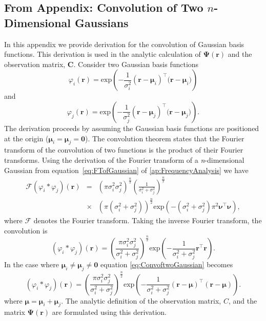 \documentclass[10pt]{article}
\begin{document}
\subsection*{From Appendix: Convolution of Two $n$-Dimensional Gaussians}\label{ap:ConvOfGaussians}
In this appendix we provide derivation for the convolution of Gaussian basis functions. This derivation is used in the analytic calculation of $\boldsymbol\Psi(\mathbf{r})$ and the observation matrix, $\mathbf C$. Consider two Gaussian basis functions
\begin{equation}\label{eq:n_dimensional_Gaussian1}
 \varphi_i(\mathbf r)=\mathrm{exp}\left({-\frac{1}{\sigma_i^2} (\mathbf r-\boldsymbol \mu_i)^\top(\mathbf r-\boldsymbol \mu_i})\right)
\end{equation}
and 
\begin{equation}\label{eq:n_dimensional_Gaussian2}
\varphi_j(\mathbf r)=\mathrm{exp}\left({-\frac{1}{\sigma_j^2} (\mathbf r-\boldsymbol \mu_j)^\top(\mathbf r-\boldsymbol \mu_j})\right).
\end{equation}
The derivation proceeds by assuming the Gaussian basis functions are positioned at the origin ($\boldsymbol\mu_i=\boldsymbol\mu_j=\mathbf 0$). The convolution theorem states that the Fourier transform of the convolution of two functions is the product of their Fourier transforms. Using the derivation of the Fourier transform of a \emph{n}-dimensional Gaussian from equation~\ref{eq:FTofGaussian} of \ref{ap:FrequencyAnalysis} we have
\begin{eqnarray}
\mathcal{F}\left(\varphi_i*\varphi_j\right)(\mathbf{r}) &=& \left(\pi\sigma_i^2\sigma_j^2\right)^{\frac{n}{2}}\left(\frac{1}{\sigma_i^2+\sigma_j^2}\right)^{\frac{n}{2}} \nonumber \\
&\times& (\pi(\sigma_i^2+\sigma_j^2))^{\frac{n}{2}}\mathrm{exp}\left(-(\sigma_i^2+\sigma_j^2)\pi^2\boldsymbol\nu^\top\boldsymbol\nu\right),
\end{eqnarray}
where $\mathcal{F}$ denotes the Fourier transform. Taking the inverse Fourier transform, the convolution is
\begin{equation}\label{eq:ConvoftwoGaussian}
 \left(\varphi_i*\varphi_j\right)(\mathbf{r}) = \left(\frac{\pi\sigma_i^2\sigma_j^2}{\sigma_i^2+\sigma_j^2}\right)^{\frac{n}{2}}\mathrm{exp}\left({-\frac{1}{\sigma_i^2+\sigma_j^2} \mathbf r^\top\mathbf r}\right).
\end{equation}
In the case where $\boldsymbol\mu_i\neq\boldsymbol\mu_j\neq\mathbf 0$ equation \ref{eq:ConvoftwoGaussian} becomes
\begin{equation}\label{eq:ConvoftwoGaussianNonzeroMean}
 \left(\varphi_i*\varphi_j\right)(\mathbf{r}) = \left( \frac{\pi\sigma_i^2\sigma_j^2} {\sigma_i^2+\sigma_j^2}\right)^{\frac{n}{2}} \mathrm{exp}\left({-\frac{1}{\sigma_i^2+\sigma_j^2} (\mathbf r-\boldsymbol\mu)^\top(\mathbf r-\boldsymbol\mu)}\right).
\end{equation}
where $\boldsymbol\mu=\boldsymbol\mu_i+\boldsymbol\mu_j$. 
The analytic definition of the observation matrix, $C$, and the matrix $\boldsymbol\Psi(\mathbf{r})$ are formulated using this derivation.  
\end{document}
